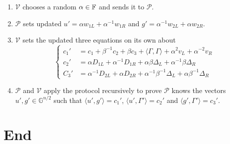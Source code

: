 \documentclass{article}
\begin{document}
\begin{boxx1}
\begin{enumerate}
\item\label{item:104} $\mathcal{V}$ chooses a random $\alpha \in \mathbb{F}$ and sends it to $\mathcal{P}$. 
\item\label{item:105} $\mathcal{P}$ sets updated $u' = \alpha w_{1L} + \alpha^{-1} w_{1R}$ and $g' = \alpha^{-1} w_{2L} + \alpha w_{2R}$. 
\item\label{item:106} $\mathcal{V}$ sets the updated three equations on its own about
\begin{equation*}
\begin{cases}
c_1' & = c_1 + \beta^{-1} c_2 + \beta c_3 + \langle \Gamma, \Gamma \rangle + \alpha^2 v_L + \alpha^{-2} v_R \\
c_2' & = \alpha D_{1L} + \alpha^{-1} D_{1R} + \alpha \beta \Delta_L + \alpha^{-1} \beta \Delta_{R} \\
C_3' & = \alpha^{-1} D_{2L} + \alpha D_{2R} + \alpha^{-1} \beta^{-1} \Delta_L + \alpha \beta^{-1} \Delta_R
\end{cases}
\end{equation*}
\item\label{item:107} $\mathcal{P}$ and $\mathcal{V}$ apply the protocol recursively to prove $\mathcal{P}$ knows the vectors $u', g' \in \mathbb{G}^{n/2}$ such that $\langle u', g'\rangle = c_1'$, $\langle u', \Gamma' \rangle = c_2'$ and $\langle g', \Gamma' \rangle = c_3'$. 
\end{enumerate}
\end{boxx1}

\section{End}


\end{document}
